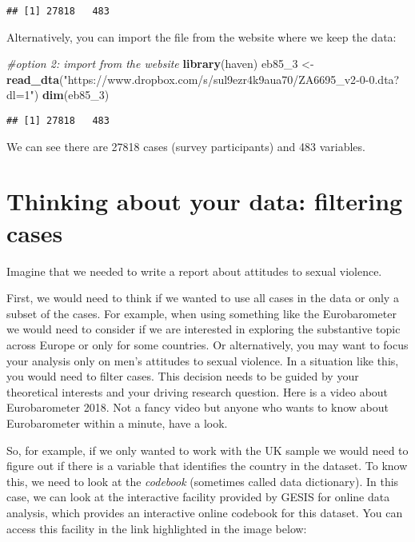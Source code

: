 \documentclass[
]{book}
\newenvironment{Shaded}{\begin{snugshade}}{\end{snugshade}}
\newcommand{\CommentTok}[1]{\textcolor[rgb]{0.56,0.35,0.01}{\textit{#1}}}
\newcommand{\FunctionTok}[1]{\textcolor[rgb]{0.13,0.29,0.53}{\textbf{#1}}}
\newcommand{\NormalTok}[1]{#1}
\newcommand{\OtherTok}[1]{\textcolor[rgb]{0.56,0.35,0.01}{#1}}
\newcommand{\StringTok}[1]{\textcolor[rgb]{0.31,0.60,0.02}{#1}}
\begin{document}
\begin{verbatim}
## [1] 27818   483
\end{verbatim}

Alternatively, you can import the file from the website where we keep the data:

\begin{Shaded}
\begin{Highlighting}[]
\CommentTok{\#option 2: import from the website}
\FunctionTok{library}\NormalTok{(haven)}
\NormalTok{eb85\_3 }\OtherTok{\textless{}{-}} \FunctionTok{read\_dta}\NormalTok{(}\StringTok{"https://www.dropbox.com/s/sul9ezr4k9aua70/ZA6695\_v2{-}0{-}0.dta?dl=1"}\NormalTok{)}
\FunctionTok{dim}\NormalTok{(eb85\_3)}
\end{Highlighting}
\end{Shaded}

\begin{verbatim}
## [1] 27818   483
\end{verbatim}

We can see there are 27818 cases (survey participants) and 483 variables.

\section{Thinking about your data: filtering cases}\label{thinking-about-your-data-filtering-cases}

Imagine that we needed to write a report about attitudes to sexual violence.

First, we would need to think if we wanted to use all cases in the data or only a subset of the cases. For example, when using something like the Eurobarometer we would need to consider if we are interested in exploring the substantive topic across Europe or only for some countries. Or alternatively, you may want to focus your analysis only on men's attitudes to sexual violence. In a situation like this, you would need to filter cases. This decision needs to be guided by your theoretical interests and your driving research question. Here is a video about Eurobarometer 2018. Not a fancy video but anyone who wants to know about Eurobarometer within a minute, have a look.

So, for example, if we only wanted to work with the UK sample we would need to figure out if there is a variable that identifies the country in the dataset. To know this, we need to look at the \emph{codebook} (sometimes called data dictionary). In this case, we can look at the interactive facility provided by GESIS for online data analysis, which provides an interactive online codebook for this dataset. You can access this facility in the link highlighted in the image below:
\end{document}
